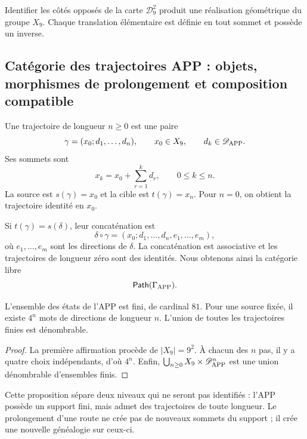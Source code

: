 \begin{corollary}
\label{p12-83-c1-s2:cor:app-soporte-toroidal}
Identifier les côtés opposés de la carte \(\mathcal D_9^2\) produit une
réalisation géométrique du groupe \(X_9\). Chaque translation élémentaire est
définie en tout sommet et possède un inverse.
\end{corollary}

\subsection{Catégorie des trajectoires APP : objets, morphismes de prolongement et composition compatible}

\begin{definition}
Une trajectoire de longueur \(n\geq0\) est une paire
\[
 \gamma=(x_0;d_1,\ldots,d_n),
 \qquad
 x_0\in X_9,\qquad d_k\in\mathscr D_{\rm APP}.
\]
Ses sommets sont
\[
 x_k=x_0+\sum_{r=1}^k d_r,
 \qquad 0\leq k\leq n.
\]
La source est \(s(\gamma)=x_0\) et la cible est
\(t(\gamma)=x_n\). Pour \(n=0\), on obtient la trajectoire identité en
\(x_0\).
\end{definition}

Si \(t(\gamma)=s(\delta)\), leur concaténation est
\[
 \delta\circ\gamma
  =(x_0;d_1,\ldots,d_n,e_1,\ldots,e_m),
\]
où \(e_1,\ldots,e_m\) sont les directions de \(\delta\). La
concaténation est associative et les trajectoires de longueur zéro sont des
identités. Nous obtenons ainsi la catégorie libre
\[
 \mathsf{Path}(\Gamma_{\rm APP}).
\]

\begin{proposition}
\label{p12-83-c1-s2:prop:app-soporte-finito-trayectorias-numerables}
L’ensemble des états de l’APP est fini, de cardinal \(81\). Pour une source
fixée, il existe \(4^n\) mots de directions de longueur \(n\). L’union
de toutes les trajectoires finies est dénombrable.
\end{proposition}

\begin{proof}
La première affirmation procède de \(|X_9|=9^2\). À chacun des \(n\)
pas, il y a quatre choix indépendants, d’où \(4^n\). Enfin,
\(\bigcup_{n\geq0}X_9\times\mathscr D_{\rm APP}^n\) est une union dénombrable
d’ensembles finis.
\end{proof}

Cette proposition sépare deux niveaux qui ne seront pas identifiés : l’APP possède un
support fini, mais admet des trajectoires de toute longueur. Le
prolongement d’une route ne crée pas de nouveaux sommets du support ; il crée une nouvelle
généalogie sur ceux-ci.


